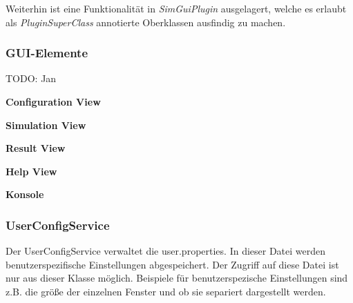 \documentclass[a4paper, 11pt]{article} %
\begin{document}
Weiterhin ist eine Funktionalität in \emph{SimGuiPlugin} ausgelagert, welche es erlaubt als \emph{PluginSuperClass} annotierte Oberklassen ausfindig zu machen. 

\subsubsection{GUI-Elemente}
\label{sssub:guiservice}
TODO: Jan

\textbf{Configuration View} %
\label{ssub:accordion}

\textbf{Simulation View} %
\label{ssub:accordion}

\textbf{Result View} %
\label{ssub:accordion}

\textbf{Help View} %
\label{ssub:accordion}

\textbf{Konsole} %
\label{ssub:accordion}

\subsubsection{UserConfigService} %
\label{ssub:userconfigservice}
Der UserConfigService verwaltet die user.properties. In dieser Datei werden benutzerspezifische Einstellungen abgespeichert. Der Zugriff auf diese Datei ist nur aus dieser Klasse möglich. Beispiele für benutzerspezische Einstellungen sind z.B. die größe der einzelnen Fenster und ob sie separiert dargestellt werden.
\end{document}
